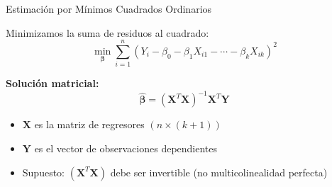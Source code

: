 \documentclass[aspectratio=169,11pt]{beamer}
\begin{document}
\begin{frame}{Estimaci\'on por M\'inimos Cuadrados Ordinarios}

Minimizamos la suma de residuos al cuadrado:
\[
\min_{\boldsymbol{\beta}} \sum_{i=1}^{n} (Y_i - \beta_0 - \beta_1 X_{i1} - \cdots - \beta_k X_{ik})^2
\]

\vspace{0.4cm}

\textbf{Soluci\'on matricial:}
\[
\hat{\boldsymbol{\beta}} = (\mathbf{X}^T \mathbf{X})^{-1} \mathbf{X}^T \mathbf{Y}
\]

\vspace{0.3cm}

\small
\begin{itemize}
    \setlength{\itemsep}{2pt}
    \item $\mathbf{X}$ es la matriz de regresores $(n \times (k+1))$
    \item $\mathbf{Y}$ es el vector de observaciones dependientes
    \item Supuesto: $(\mathbf{X}^T \mathbf{X})$ debe ser invertible (no multicolinealidad perfecta)
\end{itemize}

\end{frame}
\end{document}
